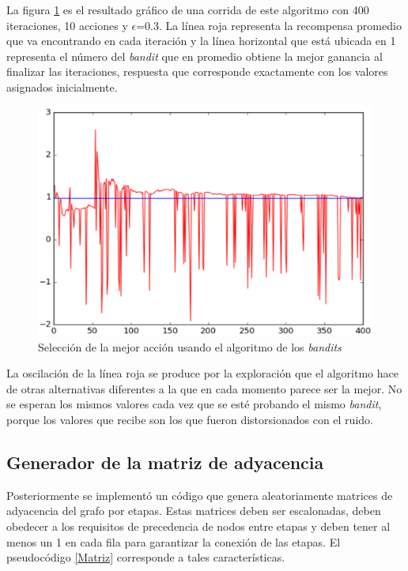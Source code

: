 La figura \ref{AlgBandit} es el resultado gráfico de una corrida de este algoritmo con 400 iteraciones, 10 acciones y $\epsilon$=0.3. La línea roja representa la recompensa promedio que va encontrando en cada iteración y la línea horizontal que está ubicada en 1 representa el número del \textit{bandit} que en promedio obtiene la mejor ganancia al finalizar las iteraciones, respuesta que corresponde exactamente con los valores asignados inicialmente.

\begin{figure} [H]
    \label{Resul2}
	\centering
	\includegraphics[scale=0.6]{AlgBandit}
	\caption[Resultado de la selección de brazo usando \textit{bandits}]{Selección de la mejor acción usando el algoritmo de los \textit{bandits}}
	\label{AlgBandit}
\end{figure}

La oscilación de la línea roja se produce por la exploración que el algoritmo hace de otras alternativas diferentes a la que en cada momento parece ser la mejor. No se esperan los mismos valores cada vez que se esté probando el mismo \textit{bandit}, porque los valores que recibe son los que fueron distorsionados con el ruido. 

\subsection{Generador de la matriz de adyacencia}

Posteriormente se implementó un código que genera aleatoriamente matrices de adyacencia del grafo por etapas. Estas matrices deben ser escalonadas, deben obedecer a los requisitos de precedencia de nodos entre etapas y deben tener al menos un 1 en cada fila para garantizar la conexión de las etapas. El pseudocódigo \ref{Matriz} corresponde a tales características.


